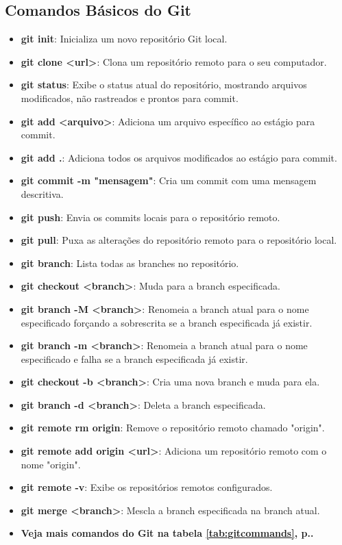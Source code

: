\subsection{Comandos Básicos do Git}
\begin{itemize}
  \item \textbf{git init}: Inicializa um novo repositório Git local.
  \item \textbf{git clone <url>}: Clona um repositório remoto para o seu computador.
  \item \textbf{git status}: Exibe o status atual do repositório, mostrando arquivos modificados, não rastreados e prontos para commit.
  \item \textbf{git add <arquivo>}: Adiciona um arquivo específico ao estágio para commit.
  \item \textbf{git add .}: Adiciona todos os arquivos modificados ao estágio para commit.
  \item \textbf{git commit -m "mensagem"}: Cria um commit com uma mensagem descritiva.
  \item \textbf{git push}: Envia os commits locais para o repositório remoto.
  \item \textbf{git pull}: Puxa as alterações do repositório remoto para o repositório local.
  \item \textbf{git branch}: Lista todas as branches no repositório.
  \item \textbf{git checkout <branch>}: Muda para a branch especificada.
  \item \textbf{git branch -M <branch>}: Renomeia a branch atual para o nome especificado forçando a sobrescrita se a branch especificada já existir.
  \item \textbf{git branch -m <branch>}: Renomeia a branch atual para o nome especificado e falha se a branch especificada já existir.
  \item \textbf{git checkout -b <branch>}: Cria uma nova branch e muda para ela.
  \item \textbf{git branch -d <branch>}: Deleta a branch especificada.
  \item \textbf{git remote rm origin}: Remove o repositório remoto chamado "origin".
  \item \textbf{git remote add origin <url>}: Adiciona um repositório remoto com o nome "origin".
  \item \textbf{git remote -v}: Exibe os repositórios remotos configurados.
  \item \textbf{git merge <branch>}: Mescla a branch especificada na branch atual.
  \item \textbf{Veja mais comandos do Git na tabela \ref{tab:gitcommands}, p.\pageref{tab:gitcommands}.}
\end{itemize}
\par
